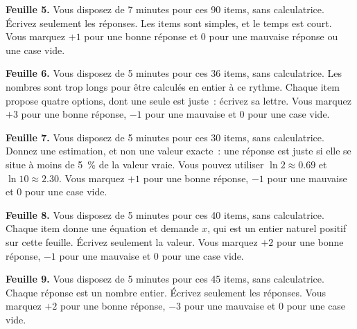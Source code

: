 \begin{question}\label{iq:iv1:speed-drills:5}
\textbf{Feuille 5.} Vous disposez de 7 minutes pour ces 90 items, sans calculatrice. Écrivez seulement les réponses. Les items sont simples, et le temps est court. Vous marquez $+1$ pour une bonne réponse et 0 pour une mauvaise réponse ou une case vide.

\end{question}
\clearpage

\begin{question}\label{iq:iv1:speed-drills:6}
\textbf{Feuille 6.} Vous disposez de 5 minutes pour ces 36 items, sans calculatrice. Les nombres sont trop longs pour être calculés en entier à ce rythme. Chaque item propose quatre options, dont une seule est juste~: écrivez sa lettre. Vous marquez $+3$ pour une bonne réponse, $-1$ pour une mauvaise et 0 pour une case vide.

\end{question}
\clearpage

\begin{question}\label{iq:iv1:speed-drills:7}
\textbf{Feuille 7.} Vous disposez de 5 minutes pour ces 30 items, sans calculatrice. Donnez une estimation, et non une valeur exacte~: une réponse est juste si elle se situe à moins de 5~\% de la valeur vraie. Vous pouvez utiliser $\ln 2 \approx 0.69$ et $\ln 10 \approx 2.30$. Vous marquez $+1$ pour une bonne réponse, $-1$ pour une mauvaise et 0 pour une case vide.

\end{question}
\clearpage

\begin{question}\label{iq:iv1:speed-drills:8}
\textbf{Feuille 8.} Vous disposez de 5 minutes pour ces 40 items, sans calculatrice. Chaque item donne une équation et demande $x$, qui est un entier naturel positif sur cette feuille. Écrivez seulement la valeur. Vous marquez $+2$ pour une bonne réponse, $-1$ pour une mauvaise et 0 pour une case vide.

\end{question}
\clearpage

\begin{question}\label{iq:iv1:speed-drills:9}
\textbf{Feuille 9.} Vous disposez de 5 minutes pour ces 45 items, sans calculatrice. Chaque réponse est un nombre entier. Écrivez seulement les réponses. Vous marquez $+2$ pour une bonne réponse, $-3$ pour une mauvaise et 0 pour une case vide.

\end{question}
\clearpage

